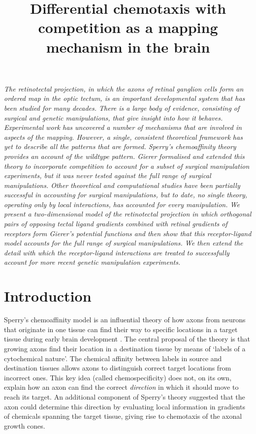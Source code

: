 \documentclass[11pt, a4paper]{article}
\title {
Differential chemotaxis with competition as a mapping mechanism in the brain
}
\date{} %
\author{\Authors}
\begin{document}
\maketitle

\emph{The retinotectal projection, in which the axons of retinal ganglion cells form an ordered map in the optic tectum, is an important developmental system that has been studied for many decades. There is a large body of evidence, consisting of surgical and genetic manipulations, that give insight into how it behaves. Experimental work has uncovered a number of mechanisms that are involved in aspects of the mapping. However, a single, consistent theoretical framework has yet to describe all the patterns that are formed. Sperry's chemoaffinity theory provides an account of the wildtype pattern. Gierer formalised and extended this theory to incorporate competition to account for a subset of surgical manipulation experiments, but it was never tested against the full range of surgical manipulations. Other theoretical and computational studies have been partially successful in accounting for surgical manipulations, but to date, no single theory, operating only by local interactions, has accounted for every manipulation. We present a two-dimensional model of the retinotectal projection in which orthogonal pairs of opposing tectal ligand gradients combined with retinal gradients of receptors form Gierer's potential functions and then show that this receptor-ligand model accounts for the full range of surgical manipulations. We then extend the detail with which the receptor-ligand interactions are treated to successfully account for more recent genetic manipulation experiments.}

\section{Introduction}

Sperry's chemoaffinity model is an influential theory of how axons from neurons that originate in one tissue can find their way to specific locations in a target tissue during early brain development \citep{sperry_reestablishment_1942,sperry_visuomotor_1943,sperry_chemoaffinity_1963}.
%
The central proposal of the theory is that growing axons find their location in a destination tissue by means of `labels of a cytochemical nature'. 
The chemical affinity between labels in source and destination tissues allows axons to distinguish correct target locations from incorrect ones. 
%
This key idea (called chemospecificity) does not, on its own, explain how an axon can find the correct \emph{direction} in which it should move to reach its target.  
An additional component of Sperry's theory \citep{stevens_handbook_1950,sperry_problems_1955,sperry_chemoaffinity_1963} suggested that the axon could determine this direction by evaluating local information in gradients of chemicals spanning the target tissue, giving rise to chemotaxis of the axonal growth cones.
\end{document}
